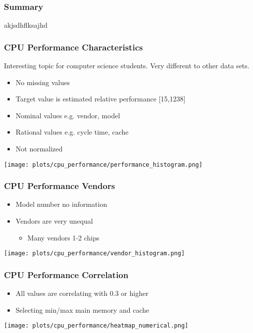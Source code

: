 \documentclass[aspectratio=169]{beamer}
\begin{document}
\begin{frame}{}
\frametitle{Summary}
akjsdhflksajhd
\end{frame}



\begin{frame}{}
\frametitle{CPU Performance Characteristics}
Interesting topic for computer science students. Very different to other data sets.
\begin{minipage}{0.3\textwidth}
\begin{itemize}
\item No missing values
\item Target value is estimated relative performance [15,1238]
\item Nominal values e.g. vendor, model
\item Rational values e.g. cycle time, cache
\item Not normalized
\end{itemize}
\end{minipage}
\begin{minipage}{0.69\textwidth}
    \texttt{[image: plots/cpu\_performance/performance\_histogram.png]}
\end{minipage}
\end{frame}

\begin{frame}{}
\frametitle{CPU Performance Vendors}
\begin{minipage}{0.3\textwidth}
\begin{itemize}
\item Model number no information
\item Vendors are very unequal
\begin{itemize}
	\item Many vendors 1-2 chips
\end{itemize}
\end{itemize}
\end{minipage}
\begin{minipage}{0.69\textwidth}
    \texttt{[image: plots/cpu\_performance/vendor\_histogram.png]}
\end{minipage}
\end{frame}

\begin{frame}{}
\frametitle{CPU Performance Correlation}
\begin{itemize}
	\item All values are correlating with 0.3 or higher
	\item Selecting min/max main memory and cache
\end{itemize}
    \center \texttt{[image: plots/cpu\_performance/heatmap\_numerical.png]}
\end{frame}
\end{document}
